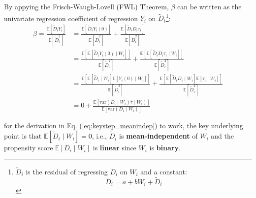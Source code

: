 \documentclass[twoside]{article}
\begin{document}
By appying the Frisch-Waugh-Lovell (FWL) Theorem, $\beta$ can be written as the univariate regression coefficient of regression $Y_i$ on $\tilde{D}_i$\footnote{$\tilde{D}_i$ is the residual of regressing $D_i$ on $W_i$ and a constant: $$D_i = a + b W_i + \tilde{D}_i$$}:
\begin{align}
    \beta = \frac{\mathbb{E}\left[\tilde{D}_iY_i\right]}{\mathbb{E}\left[\tilde{D}^2_i\right]} &= \frac{\mathbb{E}\left[\tilde{D}_iY_i(0)\right]}{\mathbb{E}\left[\tilde{D}^2_i\right]} + \frac{\mathbb{E}\left[\tilde{D}_iD_i\tau_i\right]}{\mathbb{E}\left[\tilde{D}^2_i\right]} \nonumber \\ 
    &=\frac{\mathbb{E}\left[\mathbb{E}\left[\tilde{D}_iY_i(0)\mid W_i\right]\right]}{\mathbb{E}\left[\tilde{D}^2_i\right]} + \frac{\mathbb{E}\left[\mathbb{E}\left[\tilde{D}_iD_i\tau_i\mid W_i\right]\right]}{\mathbb{E}\left[\tilde{D}^2_i\right]} \nonumber \\
    &= \frac{\mathbb{E}\left[\mathbb{E}\left[\tilde{D}_i\mid W_i\right]\mathbb{E}\left[Y_i(0)\mid W_i\right]\right]}{\mathbb{E}\left[\tilde{D}^2_i\right]} + \frac{\mathbb{E}\left[ \mathbb{E}\left[\tilde{D}_iD_i\mid W_i\right] \mathbb{E}\left[\tau_i\mid W_i\right] \right]}{\mathbb{E}\left[\tilde{D}^2_i\right]} \label{eq:keystep_meanindep}\\
    & = 0 + \frac{\mathbb{E}\left[ \mathrm{var}(D_i\mid W_i)\tau(W_i) \right]}{\mathbb{E}\left[ \mathrm{var}(D_i\mid W_i) \right]} \nonumber
\end{align}

for the derivation in Eq. (\ref{eq:keystep_meanindep}) to work, the key underlying point is that $\mathbb{E}\left[\tilde{D}_i\mid W_i\right]=0$, i.e., $\tilde{D}_i$ is \textcolor{myblue}{\textbf{mean-independent}} of $W_i$ and the propensity score $\mathbb{E}\left[ D_i\mid W_i \right]$ is \textcolor{myblue}{\textbf{linear}} since $W_i$ is \textcolor{myred}{\textbf{binary}}. 
\end{document}
